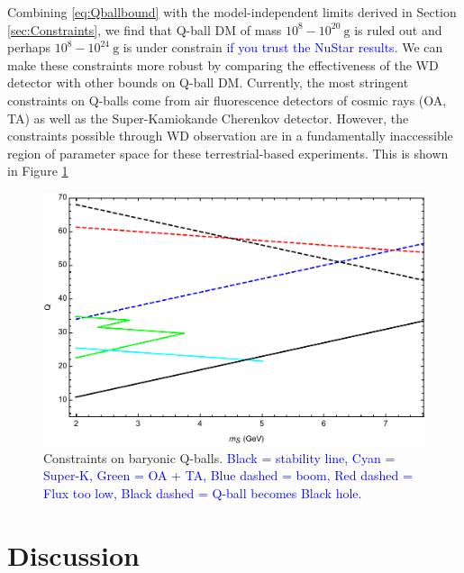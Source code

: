 \documentclass[twocolumn,showpacs,preprintnumbers,amsmath,amssymb,prd]{revtex4}
\begin{document}
Combining \eqref{eq:Qballbound} with the model-independent limits derived in Section \ref{sec:Constraints}, we find that Q-ball DM of mass $10^{8} - 10^{20} ~\text{g}$ is ruled out and perhaps $10^{8} - 10^{24} ~\text{g}$ is under constrain \textcolor{blue}{if you trust the NuStar results}. We can make these constraints more robust by comparing the effectiveness of the WD detector with other bounds on Q-ball DM. Currently, the most stringent constraints on Q-balls come from air fluorescence detectors of cosmic rays (OA, TA) as well as the Super-Kamiokande Cherenkov detector. However, the constraints possible through WD observation are in a fundamentally inaccessible region of parameter space for these terrestrial-based experiments. This is shown in Figure \ref{fig:Qballconstraint}

\begin{figure}
\includegraphics[scale=.45]{Qballconstraint.pdf}
\caption{Constraints on baryonic Q-balls. \textcolor{blue}{Black = stability line, Cyan = Super-K, Green = OA + TA, Blue dashed = boom, Red dashed = Flux too low, Black dashed = Q-ball becomes Black hole.}}
\label{fig:Qballconstraint}
\end{figure}

\section{Discussion}
\label{sec:discussion}
\end{document}
